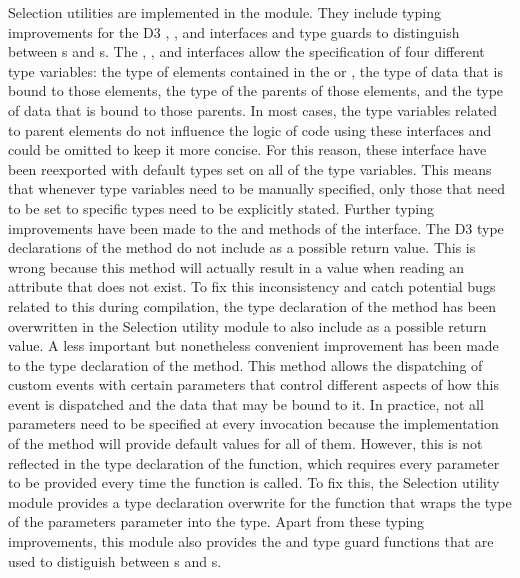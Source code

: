 Selection utilities are implemented in the  module.
They include typing improvements for the D3 , , and  interfaces and type guards to distinguish between s and s.
The , , and  interfaces allow the specification of four different type variables: the type of elements contained in the  or , the type of data that is bound to those elements, the type of the parents of those elements, and the type of data that is bound to those parents.
In most cases, the type variables related to parent elements do not influence the logic of code using these interfaces and could be omitted to keep it more concise.
For this reason, these interface have been reexported with default types set on all of the type variables.
This means that whenever type variables need to be manually specified, only those that need to be set to specific types need to be explicitly stated.
Further typing improvements have been made to the  and  methods of the  interface.
The D3 type declarations of the  method do not include  as a possible return value.
This is wrong because this method will actually result in a  value when reading an attribute that does not exist.
To fix this inconsistency and catch potential bugs related to this during compilation, the type declaration of the  method has been overwritten in the Selection utility module to also include  as a possible return value.
A less important but nonetheless convenient improvement has been made to the type declaration of the  method.
This method allows the dispatching of custom events with certain parameters that control different aspects of how this event is dispatched and the data that may be bound to it.
In practice, not all parameters need to be specified at every invocation because the implementation of the  method will provide default values for all of them.
However, this is not reflected in the type declaration of the function, which requires every parameter to be provided every time the function is called.
To fix this, the Selection utility module provides a type declaration overwrite for the  function that wraps the type of the parameters parameter into the  type.
Apart from these typing improvements, this module also provides the  and  type guard functions that are used to distiguish between s and s.


